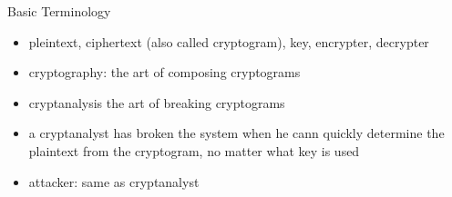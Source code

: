 \begin{parag}{Basic Terminology}
    \begin{itemize}
        \item pleintext, ciphertext (also called cryptogram), key, encrypter, decrypter
        \item cryptography: the art of composing cryptograms
        \item cryptanalysis the art of breaking cryptograms
        \item a cryptanalyst has broken the system when he cann quickly determine the plaintext from the cryptogram, no matter what key is used
        \item attacker: same as cryptanalyst
    \end{itemize}

\end{parag}
